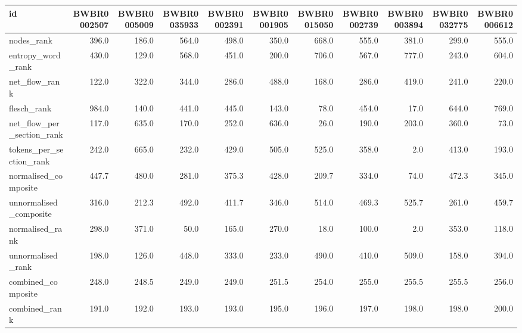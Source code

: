 \begin{tabular}{lrrrrrrrrrr}
\toprule
id & BWBR0002507 & BWBR0005009 & BWBR0035933 & BWBR0002391 & BWBR0001905 & BWBR0015050 & BWBR0002739 & BWBR0003894 & BWBR0032775 & BWBR0006612 \\
\midrule
nodes\_rank & 396.0 & 186.0 & 564.0 & 498.0 & 350.0 & 668.0 & 555.0 & 381.0 & 299.0 & 555.0 \\
\cline{1-11}
entropy\_word\_rank & 430.0 & 129.0 & 568.0 & 451.0 & 200.0 & 706.0 & 567.0 & 777.0 & 243.0 & 604.0 \\
\cline{1-11}
net\_flow\_rank & 122.0 & 322.0 & 344.0 & 286.0 & 488.0 & 168.0 & 286.0 & 419.0 & 241.0 & 220.0 \\
\cline{1-11}
flesch\_rank & 984.0 & 140.0 & 441.0 & 445.0 & 143.0 & 78.0 & 454.0 & 17.0 & 644.0 & 769.0 \\
\cline{1-11}
net\_flow\_per\_section\_rank & 117.0 & 635.0 & 170.0 & 252.0 & 636.0 & 26.0 & 190.0 & 203.0 & 360.0 & 73.0 \\
\cline{1-11}
tokens\_per\_section\_rank & 242.0 & 665.0 & 232.0 & 429.0 & 505.0 & 525.0 & 358.0 & 2.0 & 413.0 & 193.0 \\
\cline{1-11}
normalised\_composite & 447.7 & 480.0 & 281.0 & 375.3 & 428.0 & 209.7 & 334.0 & 74.0 & 472.3 & 345.0 \\
\cline{1-11}
unnormalised\_composite & 316.0 & 212.3 & 492.0 & 411.7 & 346.0 & 514.0 & 469.3 & 525.7 & 261.0 & 459.7 \\
\cline{1-11}
normalised\_rank & 298.0 & 371.0 & 50.0 & 165.0 & 270.0 & 18.0 & 100.0 & 2.0 & 353.0 & 118.0 \\
\cline{1-11}
unnormalised\_rank & 198.0 & 126.0 & 448.0 & 333.0 & 233.0 & 490.0 & 410.0 & 509.0 & 158.0 & 394.0 \\
\cline{1-11}
combined\_composite & 248.0 & 248.5 & 249.0 & 249.0 & 251.5 & 254.0 & 255.0 & 255.5 & 255.5 & 256.0 \\
\cline{1-11}
combined\_rank & 191.0 & 192.0 & 193.0 & 193.0 & 195.0 & 196.0 & 197.0 & 198.0 & 198.0 & 200.0 \\
\cline{1-11}
\bottomrule
\end{tabular}
